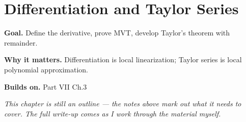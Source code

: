 \chapter{Differentiation and Taylor Series}
\label{ch:07-real-analysis-and-measure-theory-04}

\begin{chapterintro}
\textbf{Goal.} Define the derivative, prove MVT, develop Taylor's theorem with remainder.

\textbf{Why it matters.} Differentiation is local linearization; Taylor series is local polynomial approximation.

\textbf{Builds on.} Part VII Ch.3
\end{chapterintro}

\textit{This chapter is still an outline --- the notes above mark out what it needs to cover. The full write-up comes as I work through the material myself.}

